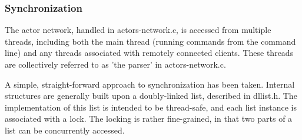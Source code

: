 \documentclass[10pt, a4paper]{article}
\begin{document}
\subsubsection*{Synchronization}

The actor network, handled in actors-network.c, is accessed from
multiple threads, including both the main thread (running commands
from the command line) and any threads associated with remotely
connected clients. These threads are collectively referred to as 'the
parser' in actors-network.c.

A simple, straight-forward approach to synchronization has been
taken. Internal structures are generally built upon a doubly-linked
list, described in dllist.h. The implementation of this list is
intended to be thread-safe, and each list instance is associated with
a lock. The locking is rather fine-grained, in that two parts of a
list can be concurrently accessed.
\end{document}
